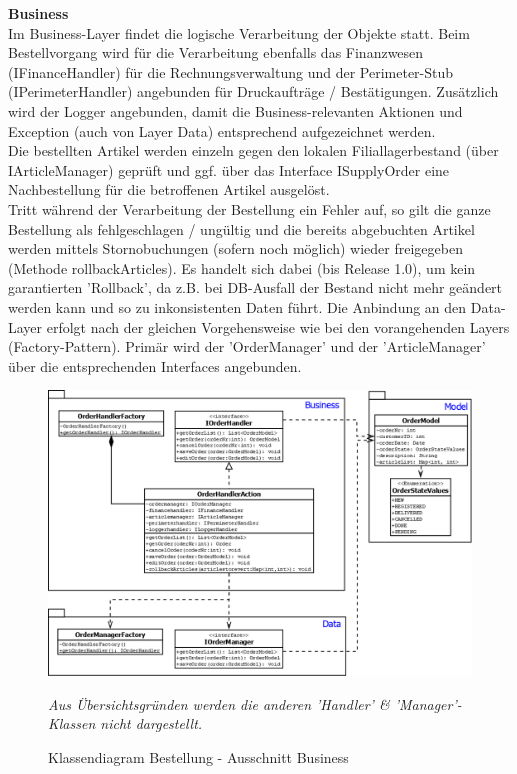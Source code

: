 \clearpage
\textbf{Business}\\
Im Business-Layer findet die logische Verarbeitung der Objekte statt. Beim Bestellvorgang wird für die Verarbeitung ebenfalls das Finanzwesen (IFinanceHandler) für die Rechnungsverwaltung und der Perimeter-Stub (IPerimeterHandler) angebunden für Druckaufträge / Bestätigungen. Zusätzlich wird der Logger angebunden, damit die Business-relevanten Aktionen und Exception (auch von Layer Data) entsprechend aufgezeichnet werden.\\
Die bestellten Artikel werden einzeln gegen den lokalen Filiallagerbestand (über IArticleManager) geprüft und ggf. über das Interface ISupplyOrder eine Nachbestellung für die betroffenen Artikel ausgelöst.\\
Tritt während der Verarbeitung der Bestellung ein Fehler auf, so gilt die ganze Bestellung als fehlgeschlagen / ungültig und die bereits abgebuchten Artikel werden mittels Stornobuchungen (sofern noch möglich) wieder freigegeben (Methode rollbackArticles). Es handelt sich dabei (bis Release 1.0), um kein garantierten 'Rollback', da z.B. bei DB-Ausfall der Bestand nicht mehr geändert werden kann und so zu inkonsistenten Daten führt.
Die Anbindung an den Data-Layer erfolgt nach der gleichen Vorgehensweise wie bei den vorangehenden Layers (Factory-Pattern). Primär wird der 'OrderManager' und der 'ArticleManager' über die entsprechenden Interfaces angebunden.
\begin{figure}[H]
	\centering
	\includegraphics[width=1.0\linewidth]{Images/Class-Order-Business}
	\caption{Klassendiagram Bestellung - Ausschnitt Business}
	\label{fig:class-order-business}
\textit{Aus Übersichtsgründen werden die anderen 'Handler' \& 'Manager'-Klassen nicht dargestellt.}
\end{figure}

